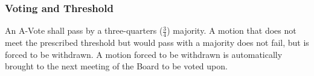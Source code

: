 \subsubsection{Voting and Threshold}
An A-Vote shall pass by a three-quarters ($\frac{3}{4}$) majority. A motion that does not meet the prescribed threshold but would pass with a majority does not fail, but is forced to be withdrawn. A motion forced to be withdrawn is automatically brought to the next meeting of the Board to be voted upon.

